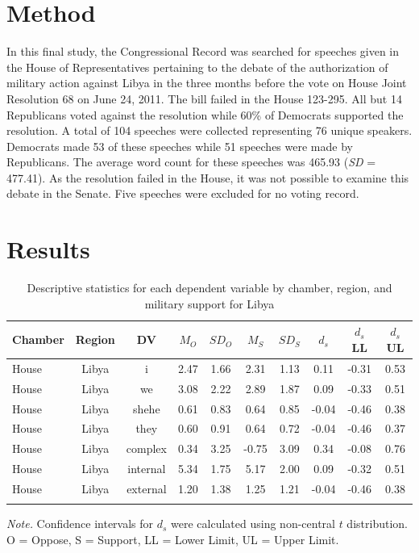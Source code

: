\documentclass[english,,man]{apa6}
\begin{document}
\hypertarget{method-5}{%
\section{Method}\label{method-5}}

In this final study, the Congressional Record was searched for speeches given in the House of Representatives pertaining to the debate of the authorization of military action against Libya in the three months before the vote on House Joint Resolution 68 on June 24, 2011. The bill failed in the House 123-295. All but 14 Republicans voted against the resolution while 60\% of Democrats supported the resolution. A total of 104 speeches were collected representing 76 unique speakers. Democrats made 53 of these speeches while 51 speeches were made by Republicans. The average word count for these speeches was 465.93 (\emph{SD} = 477.41). As the resolution failed in the House, it was not possible to examine this debate in the Senate. Five speeches were excluded for no voting record.

\hypertarget{results-4}{%
\section{Results}\label{results-4}}

\begin{table}[tbp]
\begin{center}
\begin{threeparttable}
\caption{\label{tab:Ltable}Descriptive statistics for each dependent variable by chamber, 
          region, and military support for Libya}
\small{
\begin{tabular}{lccccccccc}
\toprule
Chamber & Region & DV & $M_O$ & $SD_O$ & $M_S$ & $SD_S$ & $d_s$ & $d_s$ LL & $d_s$ UL\\
\midrule
House & Libya & i & 2.47 & 1.66 & 2.31 & 1.13 & 0.11 & -0.31 & 0.53\\
House & Libya & we & 3.08 & 2.22 & 2.89 & 1.87 & 0.09 & -0.33 & 0.51\\
House & Libya & shehe & 0.61 & 0.83 & 0.64 & 0.85 & -0.04 & -0.46 & 0.38\\
House & Libya & they & 0.60 & 0.91 & 0.64 & 0.72 & -0.04 & -0.46 & 0.37\\
House & Libya & complex & 0.34 & 3.25 & -0.75 & 3.09 & 0.34 & -0.08 & 0.76\\
House & Libya & internal & 5.34 & 1.75 & 5.17 & 2.00 & 0.09 & -0.32 & 0.51\\
House & Libya & external & 1.20 & 1.38 & 1.25 & 1.21 & -0.04 & -0.46 & 0.38\\
\bottomrule
\addlinespace
\end{tabular}
}
\begin{tablenotes}[para]
\normalsize{\textit{Note.} Confidence intervals for $d_s$ were calculated using 
          non-central $t$ distribution. O = Oppose, S = Support, LL = Lower Limit, UL = Upper Limit.}
\end{tablenotes}
\end{threeparttable}
\end{center}
\end{table}
\end{document}

